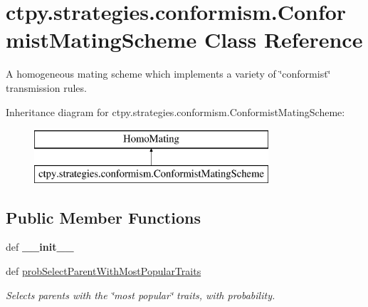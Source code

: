 \hypertarget{classctpy_1_1strategies_1_1conformism_1_1_conformist_mating_scheme}{\section{ctpy.\-strategies.\-conformism.\-Conformist\-Mating\-Scheme Class Reference}
\label{classctpy_1_1strategies_1_1conformism_1_1_conformist_mating_scheme}
}


A homogeneous mating scheme which implements a variety of \char`\"{}conformist\char`\"{} transmission rules.  


Inheritance diagram for ctpy.\-strategies.\-conformism.\-Conformist\-Mating\-Scheme\-:\begin{figure}[H]
\begin{center}
\leavevmode
\includegraphics[height=2.000000cm]{classctpy_1_1strategies_1_1conformism_1_1_conformist_mating_scheme}
\end{center}
\end{figure}
\subsection*{Public Member Functions}
\begin{DoxyCompactItemize}
\item 
\hypertarget{classctpy_1_1strategies_1_1conformism_1_1_conformist_mating_scheme_abb9cbd891f0d3a9aeaa215667545d33f}{def {\bfseries \-\_\-\-\_\-init\-\_\-\-\_\-}}\label{classctpy_1_1strategies_1_1conformism_1_1_conformist_mating_scheme_abb9cbd891f0d3a9aeaa215667545d33f}

\item 
\hypertarget{classctpy_1_1strategies_1_1conformism_1_1_conformist_mating_scheme_a45b0ad3f6028fed92b50dcd45ac6533e}{def \hyperlink{classctpy_1_1strategies_1_1conformism_1_1_conformist_mating_scheme_a45b0ad3f6028fed92b50dcd45ac6533e}{prob\-Select\-Parent\-With\-Most\-Popular\-Traits}}\label{classctpy_1_1strategies_1_1conformism_1_1_conformist_mating_scheme_a45b0ad3f6028fed92b50dcd45ac6533e}

\begin{DoxyCompactList}\small\item\em Selects parents with the \char`\"{}most popular\char`\"{} traits, with probability. \end{DoxyCompactList}\end{DoxyCompactItemize}


